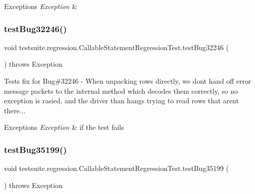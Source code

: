\begin{DoxyExceptions}{Exceptions}
{\em Exception} & \\
\hline
\end{DoxyExceptions}
\mbox{\label{classtestsuite_1_1regression_1_1_callable_statement_regression_test_ae409019fbd71b0dbfac43b3a30ed326e}} 
\subsubsection{\texorpdfstring{test\+Bug32246()}{testBug32246()}}
{\footnotesize\ttfamily void testsuite.\+regression.\+Callable\+Statement\+Regression\+Test.\+test\+Bug32246 (\begin{DoxyParamCaption}{ }\end{DoxyParamCaption}) throws Exception}

Tests fix for Bug\#32246 -\/ When unpacking rows directly, we don\textquotesingle{}t hand off error message packets to the internal method which decodes them correctly, so no exception is rasied, and the driver than hangs trying to read rows that aren\textquotesingle{}t there...


\begin{DoxyExceptions}{Exceptions}
{\em Exception} & if the test fails \\
\hline
\end{DoxyExceptions}
\mbox{\label{classtestsuite_1_1regression_1_1_callable_statement_regression_test_a179ee076f989c2634e8cd243f235985a}} 
\subsubsection{\texorpdfstring{test\+Bug35199()}{testBug35199()}}
{\footnotesize\ttfamily void testsuite.\+regression.\+Callable\+Statement\+Regression\+Test.\+test\+Bug35199 (\begin{DoxyParamCaption}{ }\end{DoxyParamCaption}) throws Exception}

